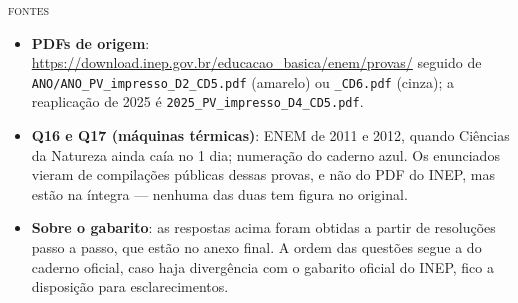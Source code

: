 \documentclass[11pt,a4paper]{article}
\begin{document}
\begin{painel}
{\small\scshape\color{grafite}fontes}\par\smallskip
\small
\begin{itemize}[nosep, leftmargin=1.5em]
  \item \textbf{PDFs de origem}:
        \url{https://download.inep.gov.br/educacao_basica/enem/provas/}
        seguido de \texttt{ANO/ANO\_PV\_impresso\_D2\_CD5.pdf}
        (amarelo) ou \texttt{\_CD6.pdf} (cinza); a reaplica\c{c}\~ao de 2025 \'e
        \texttt{2025\_PV\_impresso\_D4\_CD5.pdf}.
  \item \textbf{Q16 e Q17 (m\'aquinas t\'ermicas)}: ENEM de 2011 e 2012,
        quando Ci\^encias da Natureza ainda ca\'ia no
        1\textordmasculine{} dia; numera\c{c}\~ao do caderno azul. Os
        enunciados vieram de compila\c{c}\~oes p\'ublicas dessas provas, e
        n\~ao do PDF do INEP, mas est\~ao na \'integra --- nenhuma das duas
        tem figura no original.
  \item \textbf{Sobre o gabarito}: as respostas acima foram obtidas
        a partir de resolu\c{c}\~oes passo a passo, que est\~ao
        no anexo final. A ordem das quest\~oes segue a do caderno oficial,
        caso haja divergência com o gabarito oficial do INEP, fico a disposição para esclarecimentos.
        
\end{itemize}
\end{painel}
\end{document}
